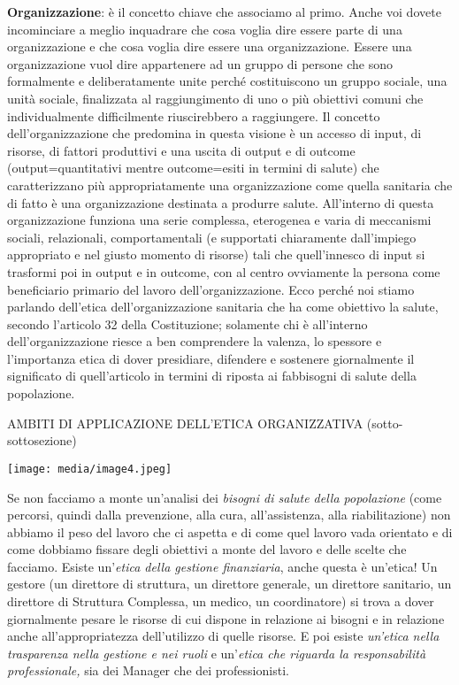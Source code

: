 \documentclass[]{article}
\begin{document}
\textbf{Organizzazione}: è il concetto chiave che associamo al primo.
Anche voi dovete incominciare a meglio inquadrare che cosa voglia dire
essere parte di una organizzazione e che cosa voglia dire essere una
organizzazione. Essere una organizzazione vuol dire appartenere ad un
gruppo di persone che sono formalmente e deliberatamente unite perché
costituiscono un gruppo sociale, una unità sociale, finalizzata al
raggiungimento di uno o più obiettivi comuni che individualmente
difficilmente riuscirebbero a raggiungere. Il concetto
dell'organizzazione che predomina in questa visione è un accesso di
input, di risorse, di fattori produttivi e una uscita di output e di
outcome (output=quantitativi mentre outcome=esiti in termini di salute)
che caratterizzano più appropriatamente una organizzazione come quella
sanitaria che di fatto è una organizzazione destinata a produrre salute.
All'interno di questa organizzazione funziona una serie complessa,
eterogenea e varia di meccanismi sociali, relazionali, comportamentali
(e supportati chiaramente dall'impiego appropriato e nel giusto momento
di risorse) tali che quell'innesco di input si trasformi poi in output e
in outcome, con al centro ovviamente la persona come beneficiario
primario del lavoro dell'organizzazione. Ecco perché noi stiamo parlando
dell'etica dell'organizzazione sanitaria che ha come obiettivo la
salute, secondo l'articolo 32 della Costituzione; solamente chi è
all'interno dell'organizzazione riesce a ben comprendere la valenza, lo
spessore e l'importanza etica di dover presidiare, difendere e sostenere
giornalmente il significato di quell'articolo in termini di riposta ai
fabbisogni di salute della popolazione.

AMBITI DI APPLICAZIONE DELL'ETICA ORGANIZZATIVA (sotto-sottosezione)

\texttt{[image: media/image4.jpeg]}

Se non facciamo a monte un'analisi dei \emph{bisogni di salute della
popolazione} (come percorsi, quindi dalla prevenzione, alla cura,
all'assistenza, alla riabilitazione) non abbiamo il peso del lavoro che
ci aspetta e di come quel lavoro vada orientato e di come dobbiamo
fissare degli obiettivi a monte del lavoro e delle scelte che facciamo.
Esiste un'\emph{etica della gestione finanziaria}, anche questa è
un'etica! Un gestore (un direttore di struttura, un direttore generale,
un direttore sanitario, un direttore di Struttura Complessa, un medico,
un coordinatore) si trova a dover giornalmente pesare le risorse di cui
dispone in relazione ai bisogni e in relazione anche all'appropriatezza
dell'utilizzo di quelle risorse. E poi esiste \emph{un'etica nella
trasparenza nella gestione e nei ruoli} e un'\emph{etica che riguarda la
responsabilità professionale,} sia dei Manager che dei professionisti.
\end{document}

